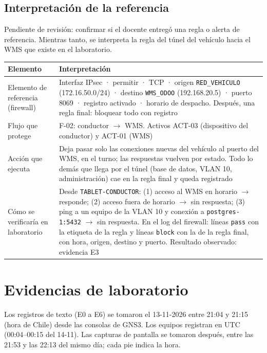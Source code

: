 \documentclass[11pt,a4paper]{article}
\newcommand{\ra}{\ensuremath{\rightarrow}}
\newcommand{\cd}[1]{\texttt{#1}}
\begin{document}
\subsection{Interpretación de la referencia}

Pendiente de revisión: confirmar si el docente entregó una regla o alerta de referencia. Mientras tanto, se interpreta la regla del túnel del vehículo hacia el WMS que existe en el laboratorio.

{\small
\begin{longtable}{@{}P{3.6cm}P{10.8cm}@{}}
\toprule
\textbf{Elemento} & \textbf{Interpretación} \\ \midrule
\endhead
Elemento de referencia (firewall) & Interfaz IPsec · permitir · TCP · origen \cd{RED\_VEHICULO} (172.16.50.0/24) · destino \cd{WMS\_ODOO} (192.168.20.5) · puerto 8069 · registro activado · horario de despacho. Después, una regla final: bloquear todo con registro \\ \midrule
Flujo que protege & F-02: conductor \ra{} WMS. Activos ACT-03 (dispositivo del conductor) y ACT-01 (WMS) \\ \midrule
Acción que ejecuta & Deja pasar solo las conexiones nuevas del vehículo al puerto del WMS, en el turno; las respuestas vuelven por estado. Todo lo demás que llega por el túnel (base de datos, VLAN 10, administración) cae en la regla final y queda registrado \\ \midrule
Cómo se verificaría en laboratorio & Desde \cd{TABLET-CONDUCTOR}: (1) acceso al WMS en horario \ra{} responde; (2) acceso fuera de horario \ra{} sin respuesta; (3) ping a un equipo de la VLAN 10 y conexión a \cd{postgres-1:5432} \ra{} sin respuesta. En el log del firewall: líneas \cd{pass} con la etiqueta de la regla y líneas \cd{block} con la de la regla final, con hora, origen, destino y puerto. Resultado observado: evidencia E3 \\ \bottomrule
\end{longtable}
}

\newpage
\section{Evidencias de laboratorio}

Los registros de texto (E0 a E6) se tomaron el 13-11-2026 entre 21:04 y 21:15 (hora de Chile) desde las consolas de GNS3. Los equipos registran en UTC (00:04–00:15 del 14-11). Las capturas de pantalla se tomaron después, entre las 21:53 y las 22:13 del mismo día; cada pie indica la hora.
\end{document}
